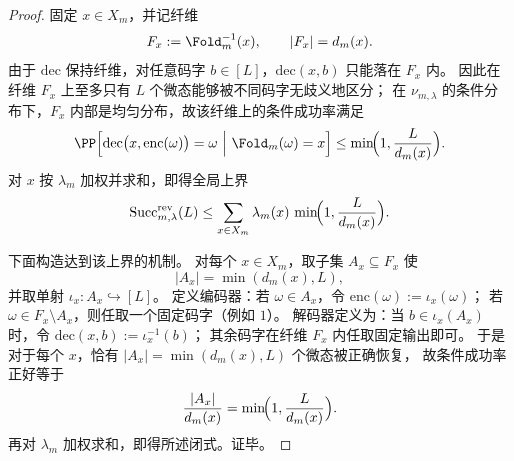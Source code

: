 \begin{proof}
固定 \(x\in X_m\)，并记纤维
\[
F_x:=\Fold_m^{-1}(x),
\qquad |F_x|=d_m(x).
\]
由于 \(\mathrm{dec}\) 保持纤维，对任意码字 \(b\in[L]\)，\(\mathrm{dec}(x,b)\) 只能落在 \(F_x\) 内。
因此在纤维 \(F_x\) 上至多只有 \(L\) 个微态能够被不同码字无歧义地区分；
在 \(\nu_{m,\lambda}\) 的条件分布下，\(F_x\) 内部是均匀分布，故该纤维上的条件成功率满足
\[
\PP\Bigl[
\mathrm{dec}\bigl(x,\mathrm{enc}(\omega)\bigr)=\omega
\ \Big|\ \Fold_m(\omega)=x
\Bigr]
\le
\min\!\Bigl(1,\frac{L}{d_m(x)}\Bigr).
\]
对 \(x\) 按 \(\lambda_m\) 加权并求和，即得全局上界
\[
\mathrm{Succ}^{\mathrm{rev}}_{m,\lambda}(L)
\le
\sum_{x\in X_m}\lambda_m(x)\,
\min\!\Bigl(1,\frac{L}{d_m(x)}\Bigr).
\]
\par
下面构造达到该上界的机制。
对每个 \(x\in X_m\)，取子集 \(A_x\subseteq F_x\) 使
\[
|A_x|=\min(d_m(x),L),
\]
并取单射 \(\iota_x:A_x\hookrightarrow [L]\)。
定义编码器：若 \(\omega\in A_x\)，令 \(\mathrm{enc}(\omega):=\iota_x(\omega)\)；
若 \(\omega\in F_x\setminus A_x\)，则任取一个固定码字（例如 \(1\)）。
解码器定义为：当 \(b\in \iota_x(A_x)\) 时，令 \(\mathrm{dec}(x,b):=\iota_x^{-1}(b)\)；
其余码字在纤维 \(F_x\) 内任取固定输出即可。
于是对于每个 \(x\)，恰有 \(|A_x|=\min(d_m(x),L)\) 个微态被正确恢复，
故条件成功率正好等于
\[
\frac{|A_x|}{d_m(x)}=\min\!\Bigl(1,\frac{L}{d_m(x)}\Bigr).
\]
再对 \(\lambda_m\) 加权求和，即得所述闭式。证毕。
\end{proof}

